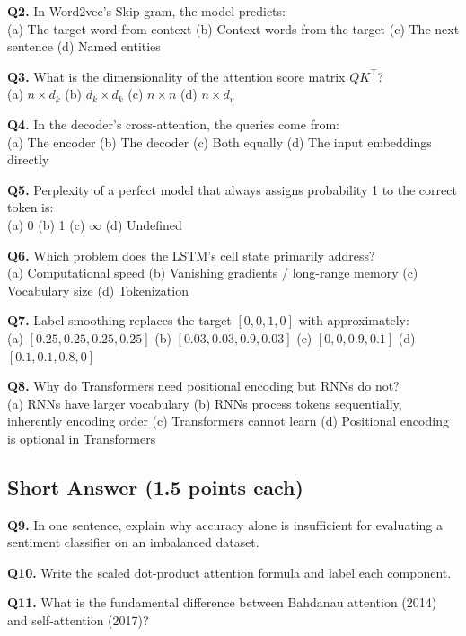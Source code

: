 \documentclass[11pt, a4paper]{article}
\begin{document}
\textbf{Q2.} In Word2vec's Skip-gram, the model predicts:\\
(a) The target word from context \quad (b) Context words from the target \quad (c) The next sentence \quad (d) Named entities

\textbf{Q3.} What is the dimensionality of the attention score matrix $QK^\top$?\\
(a) $n \times d_k$ \quad (b) $d_k \times d_k$ \quad (c) $n \times n$ \quad (d) $n \times d_v$

\textbf{Q4.} In the decoder's cross-attention, the queries come from:\\
(a) The encoder \quad (b) The decoder \quad (c) Both equally \quad (d) The input embeddings directly

\textbf{Q5.} Perplexity of a perfect model that always assigns probability 1 to the correct token is:\\
(a) 0 \quad (b) 1 \quad (c) $\infty$ \quad (d) Undefined

\textbf{Q6.} Which problem does the LSTM's cell state primarily address?\\
(a) Computational speed \quad (b) Vanishing gradients / long-range memory \quad (c) Vocabulary size \quad (d) Tokenization

\textbf{Q7.} Label smoothing replaces the target $[0,0,1,0]$ with approximately:\\
(a) $[0.25, 0.25, 0.25, 0.25]$ \quad (b) $[0.03, 0.03, 0.9, 0.03]$ \quad (c) $[0, 0, 0.9, 0.1]$ \quad (d) $[0.1, 0.1, 0.8, 0]$

\textbf{Q8.} Why do Transformers need positional encoding but RNNs do not?\\
(a) RNNs have larger vocabulary \quad (b) RNNs process tokens sequentially, inherently encoding order \quad (c) Transformers cannot learn \quad (d) Positional encoding is optional in Transformers

\subsection*{Short Answer (1.5 points each)}

\textbf{Q9.} In one sentence, explain why accuracy alone is insufficient for evaluating a sentiment classifier on an imbalanced dataset.

\textbf{Q10.} Write the scaled dot-product attention formula and label each component.

\textbf{Q11.} What is the fundamental difference between Bahdanau attention (2014) and self-attention (2017)?
\end{document}
